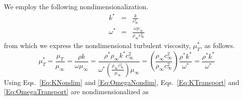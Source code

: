 We employ the following nondimensionalization.
%
%
%
%
%
\begin{eqnarray}
k^* &=& \frac{k}{c_\infty^2} \label{Eq:KNondim} \\
\omega^* &=& \frac{\omega \mu_\infty}{\rho_\infty c_\infty^2} \label{Eq:OmegaNondim}
\end{eqnarray}
%
from which we express the nondimensional turbulent viscosity, $\mu_T^*$, as follows.
%
\begin{equation}
\mu_T^* = \frac{\mu_T}{\mu_\infty}
	= \frac{\rho k}{\omega \mu_\infty}
	= \frac{\rho^* \rho_\infty k^* c_\infty^2}{\omega^* \left(\frac{\rho_\infty c_\infty^2}{\mu_\infty}\right) \mu_\infty}
	= \left(\frac{\rho_\infty c_\infty^2}{\rho_\infty c_\infty^2}\right) \frac{\rho^* k^*}{\omega^*}
	= \frac{\rho^* k^*}{\omega^*}
\end{equation}
%
Using Eqs.~\ref{Eq:KNondim} and \ref{Eq:OmegaNondim}, Eqs.~\ref{Eq:KTransport} and \ref{Eq:OmegaTransport} are nondimensionalized as

